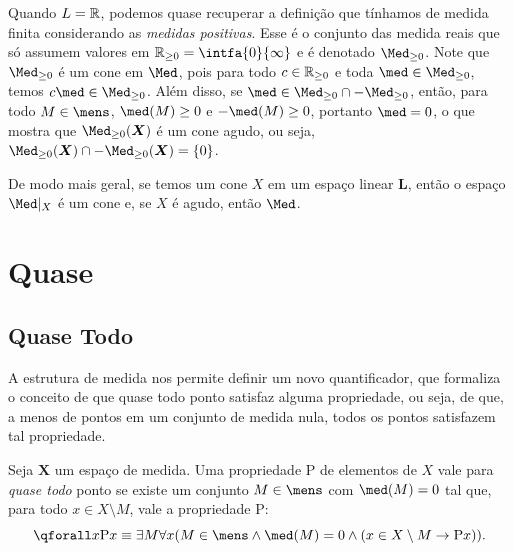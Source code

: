 Quando $L = \mathbb{R}$, podemos quase recuperar a definição que tínhamos de medida finita considerando as \emph{medidas positivas}. Esse é o conjunto das medida reais que só assumem valores em $\R_{\geq 0} = \intfa{0}{\infty}$ e é denotado $\Med_{\geq 0}$. Note que $\Med_{\geq 0}$ é um cone em $\Med$, pois para todo $c \in \mathbb{R}_{\geq 0}$ e toda $\med \in \Med_{\geq 0}$, temos $c\med \in \Med_{\geq 0}$. Além disso, se $\med \in \Med_{\geq 0} \cap -\Med_{\geq 0}$, então, para todo $M \in \mens$, $\med(M) \geq 0$ e $-\med(M) \geq 0$, portanto $\med=0$, o que mostra que $\Med_{\geq 0}(\bm X)$ é um cone agudo, ou seja, $\Med_{\geq 0}(\bm X) \cap -\Med_{\geq 0}(\bm X) = \{0\}$.

De modo mais geral, se temos um cone $X$ em um espaço linear $\bm L$, então o espaço $\Med|_X$ é um cone e, se $X$ é agudo, então $\Med$.


















\section{Quase}

\subsection{Quase Todo}

A estrutura de medida nos permite definir um novo quantificador, que formaliza o conceito de que quase todo ponto satisfaz alguma propriedade, ou seja, de que, a menos de pontos em um conjunto de medida nula, todos os pontos satisfazem tal propriedade.

\begin{defi}
Seja $\bm X$ um espaço de medida. Uma propriedade $\mathrm{P}$ de elementos de $X$ vale para \emph{quase todo} ponto se existe um conjunto $M \in \mens$ com $\med(M)=0$ tal que, para todo $x \in X \setminus M$, vale a propriedade $\mathrm{P}$:
	\begin{equation*}
	\qforall x \mathrm{P}x \equiv \exists M \forall x (M \in \mens \wedge \med(M)=0 \wedge (x \in X \setminus M \rightarrow \mathrm{P}x)).
	\end{equation*}
\end{defi}

